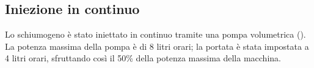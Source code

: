 
\subsection{Iniezione in continuo}
Lo schiumogeno è stato iniettato in continuo tramite una pompa volumetrica (). La potenza massima della pompa è di 8 litri orari; la portata è stata impostata a 4 litri orari, sfruttando così il 50\% della potenza massima della macchina.\\
\begin{figure}[htbp]
    \centering
{} \qquad   

\end{figure}
